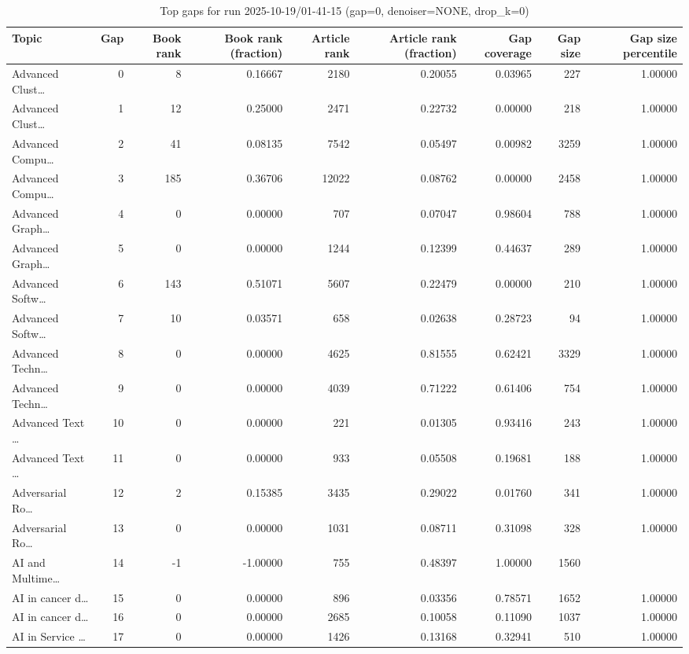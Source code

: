 \begin{table}
\caption{Top gaps for run 2025-10-19/01-41-15 (gap=0, denoiser=NONE, drop\_k=0)}
\label{tab:best_run_gap0_2025_10_19_01_41_15}
\begin{tabular}{lrrrrrrrr}
\toprule
Topic & Gap & Book rank & Book rank (fraction) & Article rank & Article rank (fraction) & Gap coverage & Gap size & Gap size percentile \\
\midrule
Advanced Clust… & 0 & 8 & 0.16667 & 2180 & 0.20055 & 0.03965 & 227 & 1.00000 \\
Advanced Clust… & 1 & 12 & 0.25000 & 2471 & 0.22732 & 0.00000 & 218 & 1.00000 \\
Advanced Compu… & 2 & 41 & 0.08135 & 7542 & 0.05497 & 0.00982 & 3259 & 1.00000 \\
Advanced Compu… & 3 & 185 & 0.36706 & 12022 & 0.08762 & 0.00000 & 2458 & 1.00000 \\
Advanced Graph… & 4 & 0 & 0.00000 & 707 & 0.07047 & 0.98604 & 788 & 1.00000 \\
Advanced Graph… & 5 & 0 & 0.00000 & 1244 & 0.12399 & 0.44637 & 289 & 1.00000 \\
Advanced Softw… & 6 & 143 & 0.51071 & 5607 & 0.22479 & 0.00000 & 210 & 1.00000 \\
Advanced Softw… & 7 & 10 & 0.03571 & 658 & 0.02638 & 0.28723 & 94 & 1.00000 \\
Advanced Techn… & 8 & 0 & 0.00000 & 4625 & 0.81555 & 0.62421 & 3329 & 1.00000 \\
Advanced Techn… & 9 & 0 & 0.00000 & 4039 & 0.71222 & 0.61406 & 754 & 1.00000 \\
Advanced Text … & 10 & 0 & 0.00000 & 221 & 0.01305 & 0.93416 & 243 & 1.00000 \\
Advanced Text … & 11 & 0 & 0.00000 & 933 & 0.05508 & 0.19681 & 188 & 1.00000 \\
Adversarial Ro… & 12 & 2 & 0.15385 & 3435 & 0.29022 & 0.01760 & 341 & 1.00000 \\
Adversarial Ro… & 13 & 0 & 0.00000 & 1031 & 0.08711 & 0.31098 & 328 & 1.00000 \\
AI and Multime… & 14 & -1 & -1.00000 & 755 & 0.48397 & 1.00000 & 1560 &  \\
AI in cancer d… & 15 & 0 & 0.00000 & 896 & 0.03356 & 0.78571 & 1652 & 1.00000 \\
AI in cancer d… & 16 & 0 & 0.00000 & 2685 & 0.10058 & 0.11090 & 1037 & 1.00000 \\
AI in Service … & 17 & 0 & 0.00000 & 1426 & 0.13168 & 0.32941 & 510 & 1.00000 \\

\end{tabular}
\end{table}
